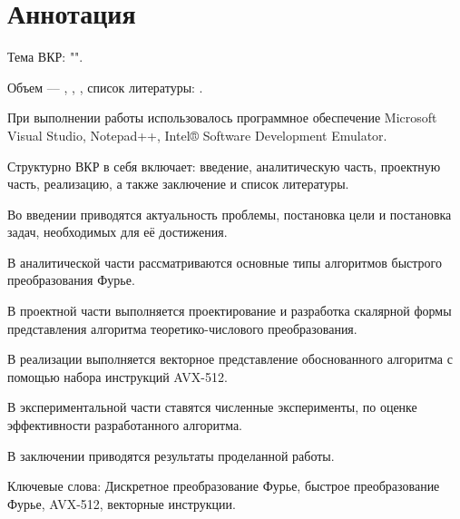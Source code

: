 \chapter*{Аннотация}
Тема ВКР: "\thetitle".

Объем –-- \totalpagecount{}, \totalfigurecount{}, \totaltablecount{}, список литературы: \totalcitationcount{}.

При выполнении работы использовалось программное обеспечение Microsoft Visual Studio, Notepad++, Intel® Software Development Emulator.

Структурно ВКР в себя включает: введение, аналитическую часть, проектную часть, реализацию, а также заключение и список литературы.

Во введении приводятся актуальность проблемы, постановка цели и постановка задач, необходимых для её достижения.

В аналитической части рассматриваются основные типы алгоритмов быстрого преобразования Фурье.

В проектной части выполняется проектирование и разработка скалярной формы представления алгоритма теоретико-числового преобразования.

В реализации выполняется векторное представление обоснованного алгоритма с помощью набора инструкций AVX-512.

В экспериментальной части ставятся численные эксперименты, по оценке эффективности разработанного алгоритма.

В заключении приводятся результаты проделанной работы.

Ключевые слова: Дискретное преобразование Фурье, быстрое преобразование Фурье, AVX-512, векторные инструкции.

